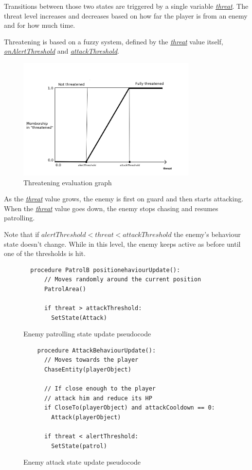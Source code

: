 \documentclass[11pt]{article}
\newcommand{\varname}[1]{\underline{\textit{#1}}}
\begin{document}
Transitions between those two states are triggered by a single variable \varname{threat}. The threat level increases and decreases based on how far the player is from an enemy and for how much time.

Threatening is based on a fuzzy system, defined by the \varname{threat} value itself, \varname{onAlertThreshold} and \varname{attackThreshold}.

\begin{figure}[H]
  \centering
  \includegraphics[width=0.8\textwidth]{figures/threat_graph}
  \caption{Threatening evaluation graph}
\end{figure}

As the \varname{threat} value grows, the enemy is first on guard and then starts attacking. When the \varname{threat} value goes down, the enemy stops chasing and resumes patrolling.

Note that if $alertThreshold < threat < attackThreshold$ the enemy's behaviour state doesn't change. While in this level, the enemy keeps active as before until one of the thresholds is hit.

\FloatBarrier

\begin{figure}
  \begin{lstlisting}
  procedure PatrolB positionehaviourUpdate():
      // Moves randomly around the current position
      PatrolArea() 

      if threat > attackThreshold:
        SetState(Attack)
  \end{lstlisting}
  \caption{Enemy patrolling state update pseudocode}
\end{figure}

\begin{figure}
  \begin{lstlisting}
    procedure AttackBehaviourUpdate():
      // Moves towards the player
      ChaseEntity(playerObject) 

      // If close enough to the player
      // attack him and reduce its HP
      if CloseTo(playerObject) and attackCooldown == 0: 
        Attack(playerObject)

      if threat < alertThreshold: 
        SetState(patrol)
  \end{lstlisting}
  \caption{Enemy attack state update pseudocode}
\end{figure}
\end{document}
